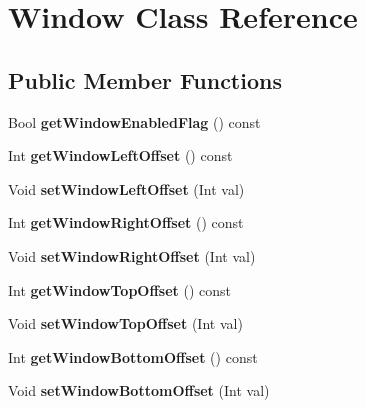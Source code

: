 \hypertarget{class_window}{}\section{Window Class Reference}
\label{class_window}
\subsection*{Public Member Functions}
\begin{DoxyCompactItemize}
\item 
\mbox{\label{class_window_aba034a6679006ab5398ffd0018cd5cbd}} 
Bool {\bfseries get\+Window\+Enabled\+Flag} () const
\item 
\mbox{\label{class_window_aaf5c7c9ebcb4c95e04ed168f38f95111}} 
Int {\bfseries get\+Window\+Left\+Offset} () const
\item 
\mbox{\label{class_window_ab418384d6f4116824a0bd1b86b5ed295}} 
Void {\bfseries set\+Window\+Left\+Offset} (Int val)
\item 
\mbox{\label{class_window_acae6cd303fefac979e1928db9a547612}} 
Int {\bfseries get\+Window\+Right\+Offset} () const
\item 
\mbox{\label{class_window_a444951f5fc933ab2bf7fb4312c1092b4}} 
Void {\bfseries set\+Window\+Right\+Offset} (Int val)
\item 
\mbox{\label{class_window_aa24037511f3718b7e572cc69fed9931d}} 
Int {\bfseries get\+Window\+Top\+Offset} () const
\item 
\mbox{\label{class_window_a4db66aabee023e3626219d2cfb271f65}} 
Void {\bfseries set\+Window\+Top\+Offset} (Int val)
\item 
\mbox{\label{class_window_a342a50a027d64b2a37d12c3358ceb4ef}} 
Int {\bfseries get\+Window\+Bottom\+Offset} () const
\item 
\mbox{\label{class_window_aa70e7579a6b0f84dbd0cc9c73c502297}} 
Void {\bfseries set\+Window\+Bottom\+Offset} (Int val)
\item 
\mbox{\label{class_window_a972cbe1a72283534f1868768d37afeff}} 

\end{DoxyCompactItemize}

